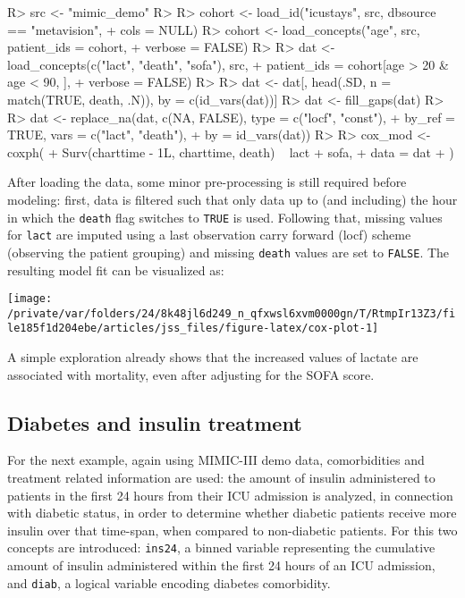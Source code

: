 \documentclass[
  notitle]{jss}
\begin{document}
\begin{CodeChunk}
\begin{CodeInput}
R> src <- "mimic_demo"
R> 
R> cohort <- load_id("icustays", src, dbsource == "metavision",
+                   cols = NULL)
R> cohort <- load_concepts("age", src, patient_ids = cohort,
+                         verbose = FALSE)
R> 
R> dat <- load_concepts(c("lact", "death", "sofa"), src,
+                      patient_ids = cohort[age > 20 & age < 90, ],
+                      verbose = FALSE)
R> 
R> dat <- dat[, head(.SD, n = match(TRUE, death, .N)), by = c(id_vars(dat))]
R> dat <- fill_gaps(dat)
R> 
R> dat <- replace_na(dat, c(NA, FALSE), type = c("locf", "const"),
+                   by_ref = TRUE, vars = c("lact", "death"),
+                   by = id_vars(dat))
R> 
R> cox_mod <- coxph(
+   Surv(charttime - 1L, charttime, death) ~ lact + sofa,
+   data = dat
+ )
\end{CodeInput}
\end{CodeChunk}

After loading the data, some minor pre-processing is still required
before modeling: first, data is filtered such that only data up to (and
including) the hour in which the \texttt{death} flag switches to
\texttt{TRUE} is used. Following that, missing values for \texttt{lact}
are imputed using a last observation carry forward (locf) scheme
(observing the patient grouping) and missing \texttt{death} values are
set to \texttt{FALSE}. The resulting model fit can be visualized as:

\begin{CodeChunk}


\begin{center}\texttt{[image: /private/var/folders/24/8k48jl6d249\_n\_qfxwsl6xvm0000gn/T/RtmpIr13Z3/file185f1d204ebe/articles/jss\_files/figure-latex/cox-plot-1]} \end{center}

\end{CodeChunk}

A simple exploration already shows that the increased values of lactate
are associated with mortality, even after adjusting for the SOFA score.

\hypertarget{diabetes-and-insulin-treatment}{%
\subsection{Diabetes and insulin
treatment}\label{diabetes-and-insulin-treatment}}

For the next example, again using MIMIC-III demo data, comorbidities and
treatment related information are used: the amount of insulin
administered to patients in the first 24 hours from their ICU admission
is analyzed, in connection with diabetic status, in order to determine
whether diabetic patients receive more insulin over that time-span, when
compared to non-diabetic patients. For this two concepts are introduced:
\texttt{ins24}, a binned variable representing the cumulative amount of
insulin administered within the first 24 hours of an ICU admission, and
\texttt{diab}, a logical variable encoding diabetes comorbidity.
\end{document}
